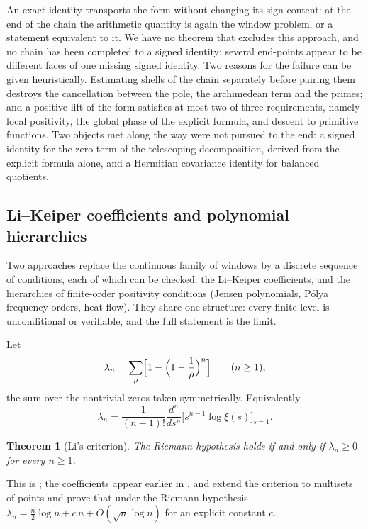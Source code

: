 \documentclass[11pt]{amsart}
\newtheorem{theorem}{Theorem}[section]
\theoremstyle{definition}
\theoremstyle{remark}
\numberwithin{equation}{section}
\begin{document}
An exact identity transports the form without changing its sign content: at the end of the chain
the arithmetic quantity is again the window problem, or a statement equivalent to it. We have no
theorem that excludes this approach, and no chain has been completed to a signed identity; several
end-points appear to be different faces of one missing signed identity. Two reasons for the
failure can be given heuristically. Estimating shells of the chain separately before pairing them
destroys the cancellation between the pole, the archimedean term and the primes; and a positive
lift of the form satisfies at most two of three requirements, namely local positivity, the global
phase of the explicit formula, and descent to primitive functions. Two objects met along the way
were not pursued to the end: a signed identity for the zero term of the telescoping decomposition,
derived from the explicit formula alone, and a Hermitian covariance identity for balanced
quotients.


\subsection{Li--Keiper coefficients and polynomial hierarchies}
\label{w6:sec:li}\label{w6:fam:R13}

Two approaches replace the continuous family of windows by a discrete sequence of conditions, each
of which can be checked: the Li--Keiper coefficients, and the hierarchies of finite-order
positivity conditions (Jensen polynomials, P\'olya frequency orders, heat flow). They share one
structure: every finite level is unconditional or verifiable, and the full statement is the limit.

Let
\[
\lambda_n=\sum_\rho\Bigl[1-\Bigl(1-\frac1\rho\Bigr)^{n}\Bigr]\qquad(n\ge1),
\]
the sum over the nontrivial zeros taken symmetrically. Equivalently
\[
\lambda_n=\frac1{(n-1)!}\frac{d^n}{ds^n}\bigl[s^{n-1}\log\xi(s)\bigr]_{s=1}.
\]

\begin{theorem}[Li's criterion]\label{w6:thm:li}
The Riemann hypothesis holds if and only if $\lambda_n\ge0$ for every $n\ge1$.
\end{theorem}

This is \cite{Li1997}; the coefficients appear earlier in \cite{Keiper1992}, and
\cite{BombieriLagarias1999} extend the criterion to multisets of points and prove that under the
Riemann hypothesis $\lambda_n=\frac n2\log n+c\,n+O(\sqrt n\log n)$ for an explicit constant $c$.
\end{document}
